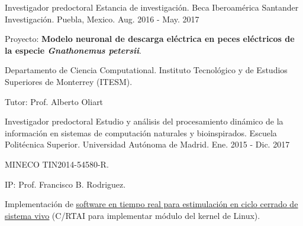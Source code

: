 \begin{cventries}


  \cventry
    {Investigador predoctoral} %
    {Estancia de investigación. Beca Iberoamérica Santander Investigación.} %
    {Puebla, Mexico.} %
    {Aug. 2016 - May. 2017} %
    {
    \begin{cvitems}
     \item {Proyecto: \textbf{Modelo neuronal de descarga eléctrica en peces eléctricos de la especie \textit{Gnathonemus petersii}}.}
     \item {Departamento de Ciencia Computational. Instituto Tecnológico y de Estudios Superiores de Monterrey (ITESM).}
     \item {Tutor: Prof. Alberto Oliart}
    \end{cvitems}
    }


  \cventry
    {Investigador predoctoral} %
    {Estudio y análisis del procesamiento dinámico de la información en sistemas de computación naturales y bioinspirados.} %
    {Escuela Politécnica Superior. Universidad Autónoma de Madrid.} %
    {Ene. 2015 - Dic. 2017} %
    {
      \begin{cvitems} %
        \item {MINECO TIN2014-54580-R.}
        \item {IP: Prof. Francisco B. Rodriguez.}
        \item {Implementación de \underline{\href{http://arantxa.ii.uam.es/~gnb/material.htm}{software en tiempo real para estimulación en ciclo cerrado de sistema vivo}} (C/RTAI para implementar módulo del kernel de Linux).}
      \end{cvitems}
    }

\end{cventries}

